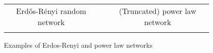\documentclass[12pt]{article}
\begin{document}
\begin{figure}[t!]%
\caption{Examples of Erdos-Renyi and power law networks}%
\vspace{-0.2cm}%
\label{fig: network_examples}%
\begin{footnotesize}%


\begin{center}%
\hspace*{-0.4cm}%
\begin{tabular}
[c]{ccc}%
Erd\H{o}s-R\'{e}nyi random network &  &
\hspace*{-0.8cm}%
(Truncated) power law network\\%
{\includegraphics[
trim=0.000000in 0.600961in 0.000000in 0.478393in,
height=2.252in,
width=2.7164in
]%
{figs/ER-graph-example.png}%
}
&  &
\hspace*{-0.8cm}%
\raisebox{-0.0415in}{\includegraphics[
trim=0.000000in 0.600961in 0.000000in 0.597835in,
height=2.2018in,
width=2.7164in
]%
{figs/PL-graph-example.png}%
}
\end{tabular}


\end{center}
\end{footnotesize}
\end{figure}
\end{document}
